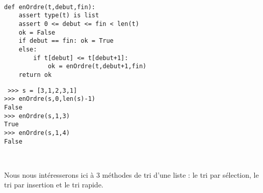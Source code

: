 \noindent\mbox{}\hspace*{1cm}\begin{py}{8cm}\tt
\begin{verbatim}
def enOrdre(t,debut,fin):
    assert type(t) is list
    assert 0 <= debut <= fin < len(t)
    ok = False
    if debut == fin: ok = True
    else:
        if t[debut] <= t[debut+1]: 
            ok = enOrdre(t,debut+1,fin)
    return ok
\end{verbatim}
\end{py}
\hfill
\begin{py}{7cm}\tt
>>> s = [3,1,2,3,1]\\
>>> enOrdre(s,0,len(s)-1)\\
False\\
>>> enOrdre(s,1,3)\\
True\\
>>> enOrdre(s,1,4)\\
False
\end{py}\\

\vspace*{2mm}
      
Nous nous intéresserons ici à 3 méthodes de tri d'une liste : le tri par sélection, 
le tri par insertion et le tri rapide.

